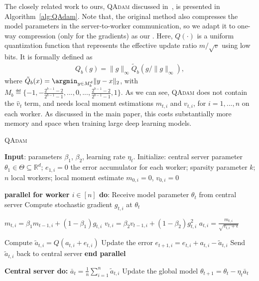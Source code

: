 \documentclass[11pt]{article}
\begin{document}
The closely related work to ours, \textsc{QAdam} discussed in~\cite{chen2020quantized}, is presented in Algorithm~\ref{alg:QAdam}. Note that, the original method also compresses the model parameters in the server-to-worker communication, so we adapt it to one-way compression (only for the gradients) as our \algo. Here, $Q(\cdot)$ is a uniform quantization function that represents the effective update ratio $m/\sqrt v$ using low bits. It is formally defined as
\begin{align*}
    Q_b(g)=\|g\|_\infty \tilde Q_b(g/\|g\|_\infty),
\end{align*}
where $\tilde Q_b(x)=\argmin_{y\in M_b^d} \|y-x\|_2$, with $M_b\eqdef \{-1,-\frac{2^{b-1}-2}{2^{b-1}-1},...,0,...,\frac{2^{b-1}-2}{2^{b-1}-1},1\}$. As we can see, \textsc{QAdam} does not contain the $\hat v_t$ term, and needs local moment estimations $m_{t,i}$ and $v_{t,i}$, for $i=1,...,n$ on each worker. As discussed in the main paper, this costs substantially more memory and space when training large deep learning models.



\begin{algorithm}[H]
\caption{\textsc{QAdam}~\cite{chen2020quantized}} \label{alg:QAdam}
\begin{algorithmic}[1]

\STATE \textbf{Input}: parameters $\beta_1$, $\beta_2$, learning rate $\eta_t$. 
\STATE Initialize: central server parameter $\theta_{1} \in \Theta \subseteq \mathbb R^d$; $e_{1,i}=0$ the error accumulator for each worker; sparsity parameter $k$; $n$ local workers; local moment estimate $m_{0,i}=0$, $v_{0,i}=0$


\STATE\textbf{parallel for worker $i \in [n]$ do}:
\STATE\quad  Receive model parameter $\theta_{t}$ from central server
\STATE\quad  Compute stochastic gradient $g_{t,i}$ at $\theta_t$

\STATE\quad   $m_{t,i}=\beta_1 m_{t-1,i}+(1-\beta_1)g_{t,i}$
\STATE\quad   $v_{t,i}=\beta_2 v_{t-1,i}+(1-\beta_2)g_{t,i}^2$
\STATE\quad   $a_{t,i}=\frac{m_{t,i}}{\sqrt{v_{t,i}+\epsilon}}$

\STATE\quad  Compute $\tilde a_{t,i}=Q(a_{t,i}+e_{t,i})$ \label{line:topkqadam} 
\STATE\quad  Update the error $e_{t+1,i}=e_{t,i}+a_{t,i}-\tilde a_{t,i}$
\STATE\quad  Send $\tilde a_{t,i}$ back to central server
\STATE \textbf{end parallel}

\STATE \textbf{Central server do:}
\STATE $\bar a_{t}=\frac{1}{n}\sum_{i=1}^n \tilde a_{t,i}$
\STATE Update the global model $\theta_{t+1}=\theta_{t}-\eta_t \bar a_{t}$

\ENDFOR
\end{algorithmic}
\end{algorithm}
\end{document}
